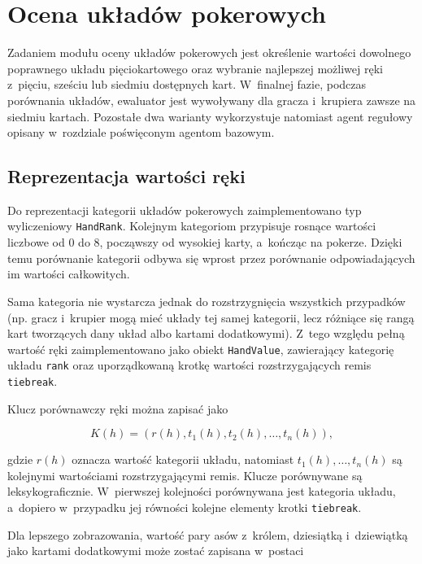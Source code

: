 \section{Ocena układów pokerowych}
\label{sec:ocena-ukladow}

Zadaniem modułu oceny układów pokerowych jest określenie wartości dowolnego
poprawnego układu pięciokartowego oraz wybranie najlepszej możliwej ręki
z~pięciu, sześciu lub siedmiu dostępnych kart. W~finalnej fazie, podczas porównania układów,
ewaluator jest wywoływany dla gracza i~krupiera zawsze na siedmiu kartach.
Pozostałe dwa warianty wykorzystuje natomiast agent regułowy
opisany w~rozdziale poświęconym agentom bazowym.

\subsection{Reprezentacja wartości ręki}
\label{subsec:wartosc-reki}

Do reprezentacji kategorii układów pokerowych zaimplementowano typ wyliczeniowy \texttt{HandRank}.
Kolejnym kategoriom przypisuje rosnące wartości liczbowe od 0 do 8, począwszy od wysokiej karty,
a~kończąc na pokerze. Dzięki temu porównanie kategorii odbywa się wprost
przez porównanie odpowiadających im wartości całkowitych.

Sama kategoria nie wystarcza jednak do rozstrzygnięcia wszystkich przypadków (np. gracz i~krupier mogą mieć układy tej samej kategorii, lecz różniące się rangą kart
tworzących dany układ albo kartami dodatkowymi). Z~tego względu pełną wartość ręki
zaimplementowano jako obiekt \texttt{HandValue}, zawierający kategorię
układu \texttt{rank} oraz uporządkowaną krotkę wartości rozstrzygających
remis \texttt{tiebreak}.

Klucz porównawczy ręki można zapisać jako

\begin{equation}
    K(h) =
    \left(
        r(h),
        t_1(h),
        t_2(h),
        \ldots,
        t_n(h)
    \right),
\end{equation}

gdzie \(r(h)\) oznacza wartość kategorii układu, natomiast
\(t_1(h),\ldots,t_n(h)\) są kolejnymi wartościami rozstrzygającymi remis.
Klucze porównywane są leksykograficznie. W~pierwszej kolejności
porównywana jest kategoria układu, a~dopiero w~przypadku jej równości
kolejne elementy krotki \texttt{tiebreak}.

Dla lepszego zobrazowania, wartość pary asów z~królem, dziesiątką i~dziewiątką jako kartami
dodatkowymi może zostać zapisana w~postaci


